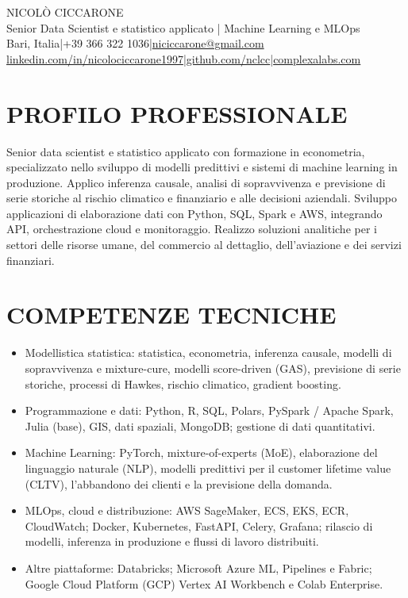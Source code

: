 \documentclass[11pt,a4paper]{article}
\renewcommand{\textbf}[1]{#1}
\let\bfseries\mdseries
\begin{document}
\begin{center}
{\LARGE\bfseries NICOLÒ CICCARONE}\\[3pt]
{\large Senior Data Scientist e statistico applicato | Machine Learning e MLOps}\\[6pt]
{\small Bari, Italia\enspace |\enspace +39 366 322 1036\enspace |\enspace\href{mailto:niciccarone@gmail.com}{niciccarone@gmail.com}\\[2pt]
\href{https://www.linkedin.com/in/nicolociccarone1997/}{linkedin.com/in/nicolociccarone1997}\enspace |\enspace\href{https://github.com/nclcc}{github.com/nclcc}\enspace |\enspace\href{https://nclcc.github.io}{complexalabs.com}}
\end{center}
\vspace{-7pt}
\section*{PROFILO PROFESSIONALE}
Senior data scientist e statistico applicato con formazione in econometria, specializzato nello sviluppo di modelli predittivi e sistemi di machine learning in produzione. Applico inferenza causale, analisi di sopravvivenza e previsione di serie storiche al rischio climatico e finanziario e alle decisioni aziendali. Sviluppo applicazioni di elaborazione dati con Python, SQL, Spark e AWS, integrando API, orchestrazione cloud e monitoraggio. Realizzo soluzioni analitiche per i settori delle risorse umane, del commercio al dettaglio, dell'aviazione e dei servizi finanziari.

\section*{COMPETENZE TECNICHE}
\begin{itemize}
\item \textbf{Modellistica statistica:} statistica, econometria, inferenza causale, modelli di sopravvivenza e mixture-cure, modelli score-driven (GAS), previsione di serie storiche, processi di Hawkes, rischio climatico, gradient boosting.
\item \textbf{Programmazione e dati:} Python, R, SQL, Polars, PySpark / Apache Spark, Julia (base), GIS, dati spaziali, MongoDB; gestione di dati quantitativi.
\item \textbf{Machine Learning:} PyTorch, mixture-of-experts (MoE), elaborazione del linguaggio naturale (NLP), modelli predittivi per il customer lifetime value (CLTV), l'abbandono dei clienti e la previsione della domanda.
\item \textbf{MLOps, cloud e distribuzione:} AWS SageMaker, ECS, EKS, ECR, CloudWatch; Docker, Kubernetes, FastAPI, Celery, Grafana; rilascio di modelli, inferenza in produzione e flussi di lavoro distribuiti.
\item \textbf{Altre piattaforme:} Databricks; Microsoft Azure ML, Pipelines e Fabric; Google Cloud Platform (GCP) Vertex AI Workbench e Colab Enterprise.
\end{itemize}
\end{document}
